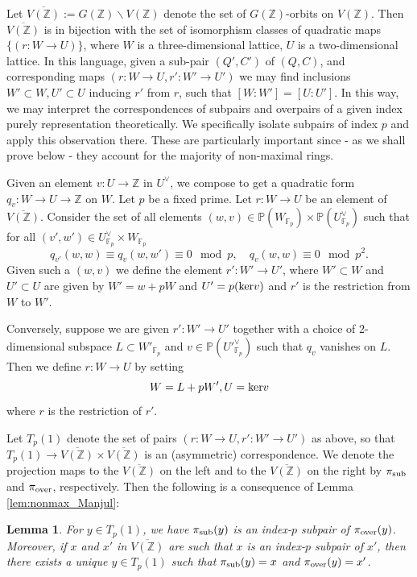 \documentclass{article}
\def\Z{{\mathbb Z}}
\def\ra{{\rightarrow}}
\def\P{{\mathbb P}}
\def\over{{\rm over}}
\def\sub{{\rm sub}}
\def\ker{{\rm ker}}
\def\F{{\mathbb F}}
\def\Z{{\mathbb Z}}
\def\P{{\mathbb P}}
\def\F{{\mathbb F}}
\def\ol{\overline}
\newtheorem{lemma}[theorem]{Lemma}
\begin{document}
Let $\overline{V(\Z)}:=G(\Z)\backslash V(\Z)$ denote the set of $G(\Z)$-orbits on $V(\Z)$. Then $\overline{V(\Z)}$ is in bijection with the set of isomorphism classes of quadratic maps $\{(r:W\to U)\}$, where $W$ is a three-dimensional lattice, $U$ is a two-dimensional lattice. In this language, given a sub-pair $(Q',C')$ of $(Q,C)$, and corresponding maps $(r:W\ra U,r':W'\ra U')$ we may find inclusions $W'\subset W, U'\subset U$ inducing $r'$ from $r$, such that $[W:W']=[U:U']$. In this way, we may interpret the correspondences of subpairs and overpairs of a given index purely representation theoretically. We specifically isolate subpairs of index $p$ and apply this observation there. These are particularly important since - as we shall prove below - they account for the majority of non-maximal rings.



\medskip

\smallskip

\noindent Given an element $v:U\to\Z$ in $U^\vee$, we compose to get a quadratic form $q_v:W\to U\to \Z$ on $W$. Let $p$ be a fixed prime.
Let $r:W\to U$ be an element of $\overline{V(\Z)}$. Consider the set of all elements $(w,v)\in \P(W_{\F_p})\times\P(U^\vee_{\F_p})$ such that
for all $(v',w')\in U^\vee_{\F_p}\times W_{\F_p}$
\begin{equation}\label{eq:T1_conditions}
q_{v'}(w,w)\equiv  q_v(w,w')\equiv 0\mod p,\quad q_v(w,w)\equiv 0\mod{p^2}.
\end{equation}
Given such a $(w,v)$ we define the element $r':W'\to U'$, where $W'\subset W$ and $U'\subset U$ are given by $W'=w+pW$ and $U'=p(\ker v)$ and $r'$ is the restriction from $W$ to $W'$.


Conversely, suppose we are given $r':W'\ra U'$ together with a choice of 2-dimensional subspace $L\subset W'_{\F_p}$ and $v\in \P(U'^{\vee}_{\F_p})$ such that $q_v$ vanishes on $L$. 
Then we define $r:W\ra U$ by setting 
$$W=L+pW',U=\ker v$$ where $r$ is the restriction of $r'$.

Let $T_p(1)$ denote the set of pairs $(r:W\to U, r':W'\to U')$ as above, so that $T_p(1)\ra \ol{V(\Z)}\times \ol{V(\Z)}$ is an (asymmetric) correspondence. We denote the projection maps to the $\ol{V(\Z)}$ on the left and to the $\ol{V(\Z)}$ on the right by $\pi_\sub$ and $\pi_\over$, respectively. Then the following is a consequence of Lemma \ref{lem:nonmax_Manjul}:
\begin{lemma}
For $y\in T_p(1)$, we have $\pi_\sub(y)$ is an index-$p$ subpair of $\pi_\over(y)$. Moreover, if $x$ and $x'$ in $\ol{V(\Z)}$ are such that $x$ is an index-$p$ subpair of $x'$, then there exists a unique $y\in T_p(1)$ such that $\pi_\sub(y)=x$ and $\pi_\over(y)=x'$. 
\end{lemma}
\end{document}
